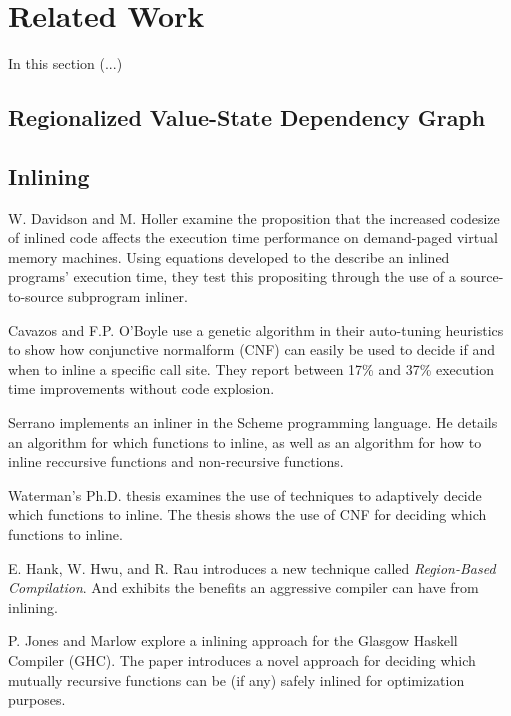 
\section{Related Work}

In this section (...)

\subsection{Regionalized Value-State Dependency Graph}

\subsection{Inlining}

W. Davidson and M. Holler \cite{SubprogInlining} examine the proposition that
the increased codesize of inlined code affects the execution time performance on
demand-paged virtual memory machines. Using equations developed to the describe
an inlined programs' execution time, they test this propositing through the use
of a source-to-source subprogram inliner.

Cavazos and F.P. O'Boyle \cite{AutoTuningJavaHeuristics} use a genetic algorithm
in their auto-tuning heuristics to show how conjunctive normalform (CNF) can
easily be used to decide if and when to inline a specific call site. They report
between 17\% and 37\% execution time improvements without code explosion.

Serrano \cite{InlineWhenHowSerrano} implements an inliner in the Scheme
programming language. He details an algorithm for which functions to inline, as
well as an algorithm for how to inline reccursive functions and non-recursive
functions.

Waterman's Ph.D. thesis \cite{AdaptvCompilAndInlingWaterman} examines the use of
techniques to adaptively decide which functions to inline. The thesis shows the
use of CNF for deciding which functions to inline.

E. Hank, W. Hwu, and R. Rau \cite{RegionBasedCompilationIntroduction} introduces
a new technique called \textit{Region-Based Compilation}. And exhibits the
benefits an aggressive compiler can have from inlining.

P. Jones and Marlow \cite{GHCPaper} explore a inlining approach for the Glasgow
Haskell Compiler (GHC). The paper introduces a novel approach for deciding which
mutually recursive functions can be (if any) safely inlined for optimization
purposes.
